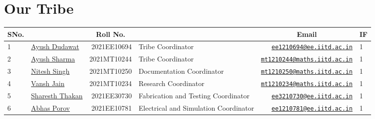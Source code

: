 \documentclass[table,french,english]{rapportCS}
\begin{document}
\section*{Our Tribe}\label{sec:ourtribeone}
\pagestyle{plain}
\begin{longtable}{|>{\raggedleft}p{.5cm}|>{\raggedleft}p{2.9cm}|r|>{\raggedleft}p{2.8cm}|r|p{.4cm}|}
\hline
SNo. & \multicolumn{1}{|c|}{Name} & \multicolumn{1}{|c|}{Roll No.} & \multicolumn{1}{|c|}{Position} & \multicolumn{1}{|c|}{Email} & \multicolumn{1}{|c|}{IF} \\
\hline
\rowcolor{lightgray}
1 & \href{https://www.linkedin.com/in/ayush-dudawat-6b7a9b222/}{Ayush Dudawat} & 2021EE10694 & Tribe Coordinator & \href{mailto:ee1210694@ee.iitd.ac.in}{\nolinkurl{ee1210694@ee.iitd.ac.in}} & 1 \\ 
\rowcolor{lightgray}
2 & \href{https://www.linkedin.com/in/ayush-sharma-b01346224/}{Ayush Sharma} & 2021MT10244 & Tribe Coordinator &
\href{mailto:mt1210244@maths.iitd.ac.in}{\nolinkurl{mt1210244@maths.iitd.ac.in}} & 1 \\
\rowcolor{lightergray}
3 & \href{https://www.linkedin.com/in/nitesh-singh-a79a17223/}{Nitesh Singh} & 2021MT10250 & Documentation Coordinator &
\href{mailto:mt1210250@maths.iitd.ac.in}{\nolinkurl{mt1210250@maths.iitd.ac.in}} & 1 \\
\rowcolor{lightergray}
4 & \href{https://www.linkedin.com/in/vansh-jain-36569b225/}{Vansh Jain} & 2021MT10234 & Research Coordinator &
\href{mailto:mt1210234@maths.iitd.ac.in}{\nolinkurl{mt1210234@maths.iitd.ac.in}} & 1 \\
\rowcolor{lightergray}
5 & \href{https://www.linkedin.com/in/sharesth-thakan-249504250/}{Sharesth Thakan} & 2021EE30730 & Fabrication and Testing Coordinator & \href{mailto:ee3210730@ee.iitd.ac.in}{\nolinkurl{ee3210730@ee.iitd.ac.in}} & 1 \\
\rowcolor{lightergray}
6 & \href{https://www.linkedin.com/in/abhas-porov-b69077248/}{Abhas Porov} & 2021EE10781 & Electrical and Simulation Coordinator &
\href{mailto:ee1210781@ee.iitd.ac.in}{\nolinkurl{ee1210781@ee.iitd.ac.in}} & 1 \\
\hline


\end{longtable}
\end{document}
